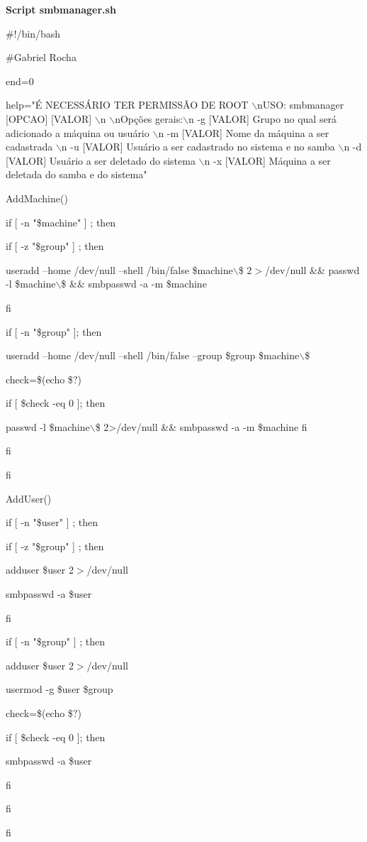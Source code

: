 \textbf{Script smbmanager.sh}

\#!/bin/bash

\#Gabriel Rocha

end=0

help="É NECESSÁRIO TER PERMISSÃO DE ROOT $\backslash$nUSO: smbmanager [OPCAO] [VALOR] $\backslash$n 
$\backslash$nOpções gerais:$\backslash$n -g [VALOR]   Grupo no qual será adicionado a máquina ou usuário  $\backslash$n -m [VALOR]   Nome da máquina a ser cadastrada $\backslash$n -u [VALOR]   Usuário a ser cadastrado no sistema e no samba $\backslash$n -d [VALOR]   Usuário a ser deletado do sistema $\backslash$n -x [VALOR]   Máquina a ser deletada do samba e do sistema"

AddMachine(){

if [ -n "\$machine" ] ; then

    if [ -z "\$group" ] ; then

        useradd --home /dev/null --shell /bin/false \$machine$\backslash$\$ 2$ >$/dev/null \&\& passwd -l \$machine$\backslash$\$ \&\& smbpasswd -a -m \$machine

    fi

    if [ -n "\$group" ]; then
	
        useradd --home /dev/null --shell /bin/false --group \$group \$machine$\backslash$\$ 

	check=\$(echo \$$?$)

		if [ \$check -eq 0 ]; then
	
 			passwd -l \$machine$\backslash$\$ 2>/dev/null \&\& smbpasswd -a -m \$machine 
       fi

    fi        

fi

}

AddUser(){

if [ -n "\$user" ] ; then

    if [ -z "\$group" ] ; then

        adduser \$user 2$>$/dev/null 

        smbpasswd -a \$user

    fi

    if [ -n "\$group" ] ; then

        adduser \$user 2$>$/dev/null

        usermod -g \$user \$group

		check=\$(echo \$$?$)

		if [ \$check -eq 0 ]; then

        	smbpasswd -a \$user

		fi
		
    fi

fi

}


